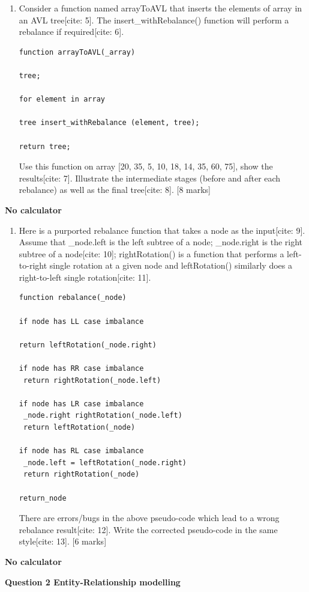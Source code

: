 \begin{enumerate}
    \item[(d)] Consider a function named arrayToAVL that inserts the elements of array in an AVL tree[cite: 5]. The insert\_withRebalance() function will perform a rebalance if required[cite: 6].
\begin{verbatim}
function arrayToAVL(_array)

tree;

for element in array

tree insert_withRebalance (element, tree);

return tree;
\end{verbatim}
Use this function on array [20, 35, 5, 10, 18, 14, 35, 60, 75], show the results[cite: 7]. Illustrate the intermediate stages (before and after each rebalance) as well as the final tree[cite: 8]. [8 marks]
\end{enumerate}

\textbf{No calculator}

\begin{enumerate}
    \item[(e)] Here is a purported rebalance function that takes a node as the input[cite: 9]. Assume that \_node.left is the left subtree of a node; \_node.right is the right subtree of a node[cite: 10]; rightRotation() is a function that performs a left-to-right single rotation at a given node and leftRotation() similarly does a right-to-left single rotation[cite: 11].
\begin{verbatim}
function rebalance(_node)

if node has LL case imbalance

return leftRotation(_node.right)

if node has RR case imbalance
 return rightRotation(_node.left)

if node has LR case imbalance
 _node.right rightRotation(_node.left)
 return leftRotation(_node)

if node has RL case imbalance
 _node.left = leftRotation(_node.right)
 return rightRotation(_node)

return_node
\end{verbatim}
There are errors/bugs in the above pseudo-code which lead to a wrong rebalance result[cite: 12]. Write the corrected pseudo-code in the same style[cite: 13]. [6 marks]
\end{enumerate}

\textbf{No calculator}

\textbf{Question 2 Entity-Relationship modelling}

